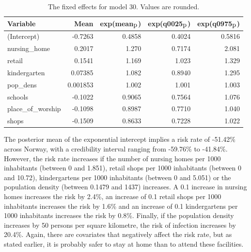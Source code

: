 \begin{table}[H] 
\caption{The fixed effects for model 30. Values are rounded. \label{fixedInfraNorway}}
\begin{tabular}{l r r r r}
\toprule
\textbf{Variable}	& \textbf{Mean}	& \textbf{exp(mean$_{\hbox{p}}$)} & \textbf{exp(q0025$_{\hbox{p}}$)} & \textbf{exp(q0975$_{\hbox{p}}$)} \\
\midrule
(Intercept) & -0.7263 & 0.4858 & 0.4024 & 0.5816 \\
nursing\_home & 0.2017 & 1.270 & 0.7174 & 2.081 \\
retail & 0.1541 & 1.169 & 1.023 & 1.329 \\
kindergarten &  0.07385  &  1.082 & 0.8940 & 1.295 \\
pop\_dens & 0.001853 & 1.002 & 1.001 & 1.003 \\
schools & -0.1022 & 0.9065 & 0.7564 & 1.076 \\
place\_of\_worship & -0.1098 & 0.8987 & 0.7710 & 1.040 \\
shops & -0.1509 & 0.8633 & 0.7228 & 1.022 \\
\bottomrule
\end{tabular}
\end{table}
The posterior mean of the exponential intercept implies a risk rate of -51.42\% across Norway, with a credibility interval ranging from -59.76\% to -41.84\%. However, the risk rate increases if the number of nursing homes per 1000 inhabitants (between 0 and 1.851), retail shops per 1000 inhabitants (between 0 and 10.72), kindergartens per 1000 inhabitants (between 0 and 5.051) or the population density (between 0.1479 and 1437) increases. A 0.1 increase in nursing homes increases the risk by 2.4\%, an increase of 0.1 retail shops per 1000 inhabitants increases the risk by 1.6\% and an increase of 0.1 kindergartens per 1000 inhabitants increases the risk by 0.8\%. Finally, if the population density increases by 50 persons per square kilometre, the risk of infection increases by 20.4\%. Again, there are covariates that negatively affect the risk rate, but as stated earlier, it is probably safer to stay at home than to attend these facilities.
